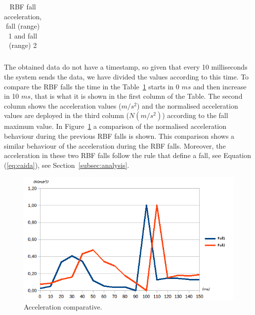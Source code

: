 \documentclass[review]{elsarticle}
\begin{document}
\begin{table}[!ht]
 \centering
 \begin{tabular}{*{5}{r}}
   
 \end{tabular}
 \caption{RBF fall acceleration, fall (range) 1 and fall (range) 2}%
 \label{tabla:RBF}
\end{table}

The obtained data do not have a timestamp, so given that every 10 milliseconds the system sends the data, we have
divided the values according to this time. To compare the RBF falls the time in the Table~\ref{tabla:RBF} 
starts in 0 $ms$ and then increase in 10 $ms$, that is what it is shown in 
the first column of the Table. The second column shows the acceleration values ($m/s^2$) and the normalised acceleration values
are deployed in the third column ($N(m/s^2)$) according to the fall maximum value. In 
Figure~\ref{fig:Sensor1} a comparison of the normalised acceleration behaviour during the previous RBF falls is shown. 
This comparison shows a similar behaviour of the acceleration during the RBF falls.
Moreover, the acceleration in these two RBF falls follow the rule that define a fall, see Equation (\ref{eq:caida}), 
see Section~\ref{subsec:analysis}.

\begin{figure}[!ht]
  \centering
  \includegraphics[scale=0.5]{img/Comparativa}
  \caption[Acceleration comparative]{Acceleration comparative.}
  \label{fig:Sensor1}
\end{figure}
\end{document}
